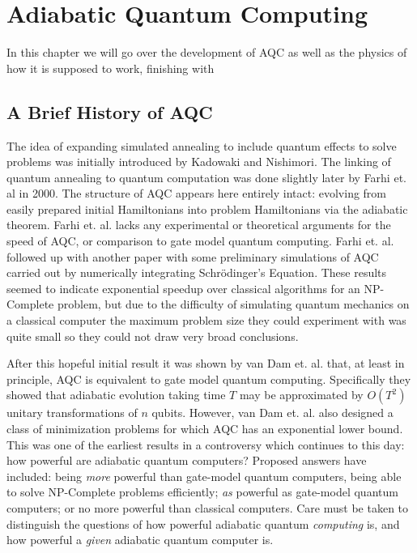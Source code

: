 \chapter{Adiabatic Quantum Computing}
\label{chap:aqc}

In this chapter we will go over the development of AQC as well as the physics of how it is supposed to work, finishing with 

\section{A Brief History of AQC}
The idea of expanding simulated annealing to include quantum effects to solve problems was initially introduced by Kadowaki and Nishimori.\cite{transverse}  The linking of quantum annealing to quantum computation was done slightly later by Farhi et. al in 2000.\cite{farhi}  The structure of AQC appears here entirely intact: evolving from easily prepared initial Hamiltonians into problem Hamiltonians via the adiabatic theorem.  Farhi et. al.\cite{farhi} lacks any experimental or theoretical arguments for the speed of AQC, or comparison to gate model quantum computing.  Farhi et. al. followed up with another paper\cite{farhi2} with some preliminary simulations of AQC carried out by numerically integrating Schr\"odinger's Equation.  These results seemed to indicate exponential speedup over classical algorithms for an NP-Complete problem, but due to the difficulty of simulating quantum mechanics on a classical computer the maximum problem size they could experiment with was quite small so they could not draw very broad conclusions.

After this hopeful initial result it was shown by van Dam et. al.\cite{vandam} that, at least in principle, AQC is equivalent to gate model quantum computing.  Specifically they showed that adiabatic evolution taking time $T$ may be approximated by $O(T^2)$ unitary transformations of $n$ qubits.  However, van Dam et. al. also designed a class of minimization problems for which AQC has an exponential lower bound.  This was one of the earliest results in a controversy which continues to this day: how powerful are adiabatic quantum computers?  Proposed answers have included: being \emph{more} powerful than gate-model quantum computers, being able to solve NP-Complete problems efficiently; \emph{as} powerful as gate-model quantum computers; or no more powerful than classical computers.  Care must be taken to distinguish the questions of how powerful adiabatic quantum \emph{computing} is, and how powerful a \emph{given} adiabatic quantum computer is.

